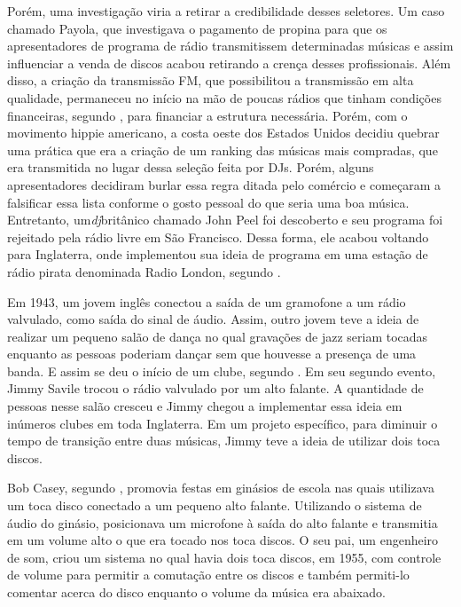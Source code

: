 \par
Porém, uma investigação viria a retirar a credibilidade desses seletores. Um caso chamado Payola, que investigava o pagamento de propina para que os apresentadores de programa de rádio transmitissem determinadas músicas e assim influenciar a venda de discos acabou retirando a crença desses profissionais. Além disso, a criação da transmissão FM, que possibilitou a transmissão em alta qualidade, permaneceu no início na mão de poucas rádios que tinham condições financeiras, segundo \cite{lastnight}, para financiar a estrutura necessária. Porém, com o movimento hippie americano, a costa oeste dos Estados Unidos decidiu quebrar uma prática que era a criação de um ranking das músicas mais compradas, que era transmitida no lugar dessa seleção feita por DJs. Porém, alguns apresentadores decidiram burlar essa regra ditada pelo comércio e começaram a falsificar essa lista conforme o gosto pessoal do que seria uma boa música. Entretanto, um\textit{dj}britânico chamado John Peel foi descoberto e seu programa foi rejeitado pela rádio livre em São Francisco. Dessa forma, ele acabou voltando para Inglaterra, onde implementou sua ideia de programa em uma estação de rádio pirata denominada Radio London, segundo \cite{lastnight}.
\par
Em 1943, um jovem inglês conectou a saída de um gramofone a um rádio valvulado, como saída do sinal de áudio. Assim, outro jovem teve a ideia de realizar um pequeno salão de dança no qual gravações de jazz seriam tocadas enquanto as pessoas poderiam dançar sem que houvesse a presença de uma banda. E assim se deu o início de um clube, segundo \cite{lastnight}. Em seu segundo evento, Jimmy Savile trocou o rádio valvulado por um alto falante. A quantidade de pessoas nesse salão cresceu e Jimmy chegou a implementar essa ideia em inúmeros clubes em toda Inglaterra. Em um projeto específico, para diminuir o tempo de transição entre duas músicas, Jimmy teve a ideia de utilizar dois toca discos.
\par
Bob Casey, segundo \cite{lastnight}, promovia festas em ginásios de escola nas quais utilizava um toca disco conectado a um pequeno alto falante. Utilizando o sistema de áudio do ginásio, posicionava um microfone à saída do alto falante e transmitia em um volume alto o que era tocado nos toca discos. O seu pai, um engenheiro de som, criou um sistema no qual havia dois toca discos, em 1955, com controle de volume para permitir a comutação entre os discos e também permiti-lo comentar acerca do disco enquanto o volume da música era abaixado. 
